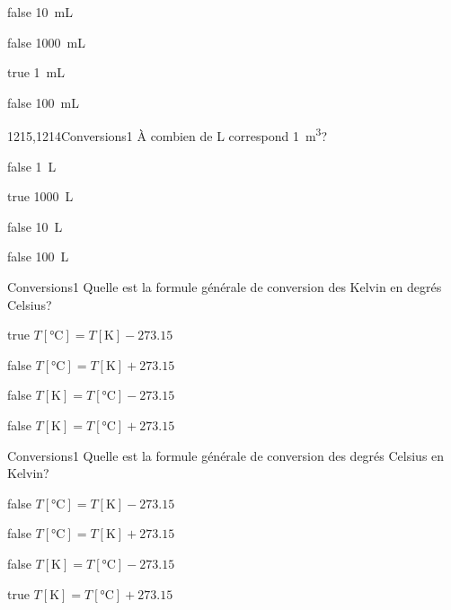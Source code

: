         \begin{reponses}
            \item[false] \SI{10}{\milli\liter}
            \item[false] \SI{1000}{\milli\liter}
            \item[true] \SI{1}{\milli\liter}
            \item[false] \SI{100}{\milli\liter}
        \end{reponses}
        \begin{question}{1215,1214}{Conversions}{1}{}
            À combien de \si{\liter} correspond \SI{1}{\meter\cubed}?
        \end{question}
        \begin{reponses}
            \item[false] \SI{1}{\liter}
            \item[true] \SI{1000}{\liter}
            \item[false] \SI{10}{\liter}
            \item[false] \SI{100}{\liter}
        \end{reponses}
        \begin{question}{}{Conversions}{1}{}
            Quelle est la formule générale de conversion des Kelvin en degrés Celsius?
        \end{question}
        \begin{reponses}
            \item[true] $T[\si{\celsius}] = T[\si{\kelvin}] - \num{273.15}$
            \item[false] $T[\si{\celsius}] = T[\si{\kelvin}] + \num{273.15}$
            \item[false] $T[\si{\kelvin}] = T[\si{\celsius}] - \num{273.15}$
            \item[false] $T[\si{\kelvin}] = T[\si{\celsius}] + \num{273.15}$
        \end{reponses}
        \begin{question}{}{Conversions}{1}{}
            Quelle est la formule générale de conversion des degrés Celsius en Kelvin?
        \end{question}
        \begin{reponses}
            \item[false] $T[\si{\celsius}] = T[\si{\kelvin}] - \num{273.15}$
            \item[false] $T[\si{\celsius}] = T[\si{\kelvin}] + \num{273.15}$
            \item[false] $T[\si{\kelvin}] = T[\si{\celsius}] - \num{273.15}$
            \item[true] $T[\si{\kelvin}] = T[\si{\celsius}] + \num{273.15}$
        \end{reponses}
